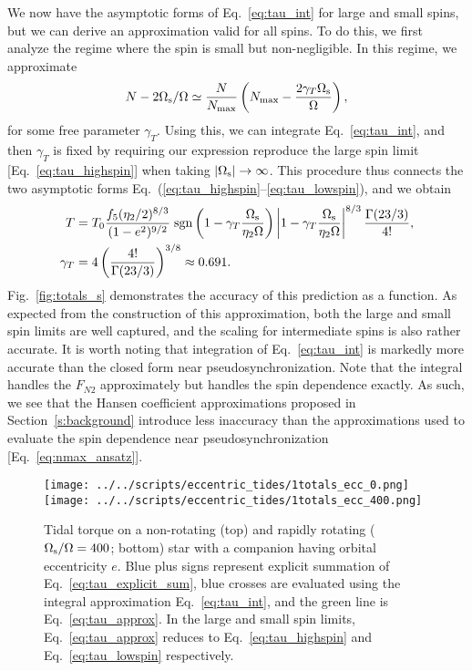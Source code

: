 \documentclass[
        fleqn,
        usenatbib,
    ]{mnras}
\newcommand*{\abs}[1]{\left|#1\right|}
\newcommand*{\p}[1]{\left(#1\right)}
\begin{document}
We now have the asymptotic forms of Eq.~\eqref{eq:tau_int} for large and small
spins, but we can derive an approximation valid for all spins. To do this, we
first analyze the regime where the spin is small but non-negligible. In this
regime, we approximate
\begin{equation}
    N - 2\Omega_{\rm s} / \Omega \simeq \frac{N}{N_{\max}}
        \left(N_{\max} - \frac{2\gamma_T
        \Omega_{\rm s}}{\Omega}\right)\label{eq:nmax_ansatz},
\end{equation}
for some free parameter $\gamma_T$. Using this, we can integrate
Eq.~\eqref{eq:tau_int}, and then $\gamma_T$ is fixed by requiring our
expression reproduce the large spin limit [Eq.~\eqref{eq:tau_highspin}] when
taking $\abs{\Omega_{\rm s}} \to \infty$. This procedure thus connects the two
asymptotic forms Eq.~(\ref{eq:tau_highspin}--\ref{eq:tau_lowspin}), and we
obtain
\begin{align}
    T &= T_0 \frac{f_5 (\eta_2/2)^{8/3}}{(1 - e^2)^{9/2}}
        \;\mathrm{sgn}\left(1 - \gamma_T\frac{\Omega_{\rm s}}{\eta_2\Omega}\right)
            \left|1 - \gamma_T\frac{\Omega_{\rm s}}{\eta_2\Omega}\right|^{8/3}
            \frac{\Gamma(23/3)}{4!},\label{eq:tau_approx}\\
    \gamma_T &= 4\p{\frac{4!}{\Gamma(23/3)}}^{3/8} \approx 0.691.
\end{align}
Fig.~\ref{fig:totals_s} demonstrates the accuracy of
this prediction as a function. As expected from the construction of this approximation, both
the large and small spin limits are well captured, and the scaling for
intermediate spins is also rather accurate. It is worth noting that integration
of Eq.~\eqref{eq:tau_int} is markedly more accurate than the closed form near
pseudosynchronization. Note that the integral handles the $F_{N2}$
approximately but handles the spin dependence exactly. As such, we see that the
Hansen coefficient approximations proposed in Section~\ref{s:background}
introduce less inaccuracy than the approximations used to evaluate the spin
dependence near pseudosynchronization [Eq.~\eqref{eq:nmax_ansatz}].
\begin{figure}
    \centering
    \texttt{[image: ../../scripts/eccentric\_tides/1totals\_ecc\_0.png]}
    \texttt{[image: ../../scripts/eccentric\_tides/1totals\_ecc\_400.png]}
    \caption{Tidal torque on a non-rotating (top) and rapidly rotating
    ($\Omega_{\rm s} / \Omega = 400$; bottom) star with a companion having
    orbital eccentricity $e$. Blue plus signs represent explicit summation of
    Eq.~\eqref{eq:tau_explicit_sum}, blue crosses are evaluated using the
    integral approximation Eq.~\eqref{eq:tau_int}, and the green line is
    Eq.~\eqref{eq:tau_approx}. In the large and small spin limits,
    Eq.~\eqref{eq:tau_approx} reduces to Eq.~\eqref{eq:tau_highspin} and
    Eq.~\eqref{eq:tau_lowspin} respectively. }\label{fig:totals_ecc0}
\end{figure}
\end{document}
